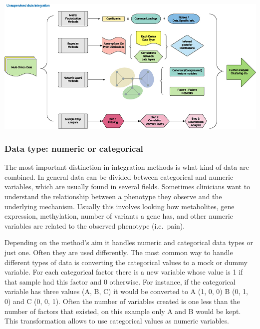 \documentclass[
  a4paper,
]{book}
\let\origfigure\figure
\let\endorigfigure\endfigure
\renewenvironment{figure}[1][2] {
    \expandafter\origfigure\expandafter[!ht]
} {
    \endorigfigure
}
\begin{document}
\begin{figure}
\includegraphics[width=1\linewidth]{images/figure1_huang2017} \caption[Unsupervised data integration methodology.]{Unsupervised data integration methodology. Figure 1 from Huang 2017.}\label{fig:classification}
\end{figure}

\hypertarget{data-type-numeric-or-categorical}{%
\subsubsection{Data type: numeric or categorical}\label{data-type-numeric-or-categorical}}

The most important distinction in integration methods is what kind of data are combined.
In general data can be divided between categorical and numeric variables, which are usually found in several fields.
Sometimes clinicians want to understand the relationship between a phenotype they observe and the underlying mechanism.
Usually this involves looking how metabolites, gene expression, methylation, number of variants a gene has, and other numeric variables are related to the observed phenotype (i.e.~pain).

Depending on the method's aim it handles numeric and categorical data types or just one.
Often they are used differently.
The most common way to handle different types of data is converting the categorical values to a mock or dummy variable.
For each categorical factor there is a new variable whose value is 1 if that sample had this factor and 0 otherwise.
For instance, if the categorical variable has three values (A, B, C) it would be converted to A (1, 0, 0) B (0, 1, 0) and C (0, 0, 1).
Often the number of variables created is one less than the number of factors that existed, on this example only A and B would be kept.
This transformation allows to use categorical values as numeric variables.
\end{document}
